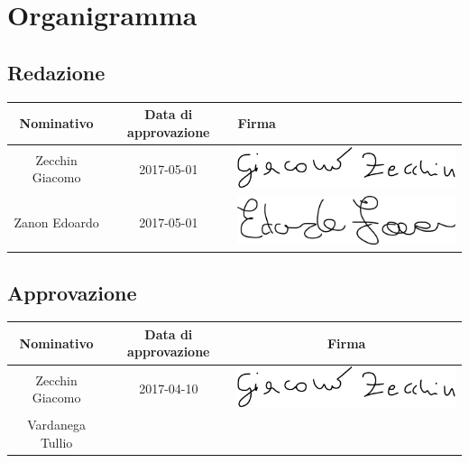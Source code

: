 \documentclass[../PianoDiProgetto_v4.0.0.tex]{subfiles}
\begin{document}
\section{Organigramma}
	\subsection{Redazione}
		\begin{table}[h]
		\begin{tabularx}{\textwidth}{C C X}
			\toprule
			\textbf{Nominativo} & \textbf{Data di approvazione} & \textbf{Firma} \\
			\midrule
			Zecchin Giacomo & 2017-05-01 & \includegraphics[scale=0.3]{Firme/gzecchin_firma} \\[1ex]
			\midrule
			Zanon Edoardo & 2017-05-01 & \includegraphics[scale=0.4]{Firme/ezanon_firma} \\[1ex]
			\bottomrule
		\end{tabularx}
		
	\end{table}
	
	
	\subsection{Approvazione}
	
		\begin{table}[h]

		\begin{tabularx}{\textwidth}{C C C}
			\toprule
			\textbf{Nominativo} & \textbf{Data di approvazione} & \textbf{Firma} \\
			\midrule
			Zecchin Giacomo & 2017-04-10 & \includegraphics[scale=0.3]{Firme/gzecchin_firma} \\[1ex]
			\midrule
			Vardanega Tullio &  &  \\[1ex]
			\bottomrule
		\end{tabularx}
		
	\end{table}	
	
\end{document}
